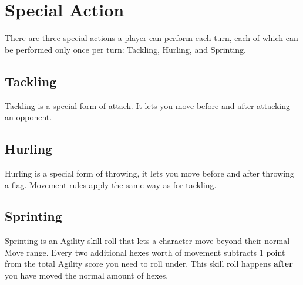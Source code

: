 \section{Special Action} \label{special-action}
There are three special actions a player can perform each turn, each of which can be performed only once per turn: Tackling, Hurling, and Sprinting.

\subsection{Tackling}
Tackling is a special form of attack. It lets you move before and after attacking an opponent.
\subsection{Hurling}
Hurling is a special form of throwing, it lets you move before and after throwing a flag.
Movement rules apply the same way as for tackling.
\subsection{Sprinting}
Sprinting is an Agility skill roll that lets a character move beyond their normal Move range.
Every two additional hexes worth of movement subtracts 1 point from the total Agility score you need to roll under.
This skill roll happens \textbf{after} you have moved the normal amount of hexes.

